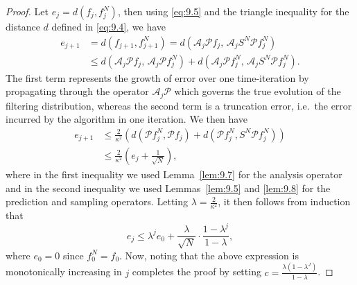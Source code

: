 \begin{proof}
  Let $e_j = d(f_j, f_j^N)$, then using \eqref{eq:9.5} and the triangle inequality for
  the distance $d$ defined in \eqref{eq:9.4}, we have
  \begin{align*}
    e_{j+1}
    &= d(f_{j+1}, f_{j+1}^N)
     = d(\mathcal{A}_j \mathcal{P} f_j,\, \mathcal{A}_j S^N \mathcal{P} f_j^N) \\
    &\leq d(\mathcal{A}_j \mathcal{P} f_j,\, \mathcal{A}_j \mathcal{P} f_j^N)
     + d(\mathcal{A}_j \mathcal{P} f_j^N,\, \mathcal{A}_j S^N \mathcal{P} f_j^N).
  \end{align*}
  The first term represents the growth of error over one time-iteration by propagating
  through the operator $\mathcal{A}_j \mathcal{P}$ which governs the true evolution of
  the filtering distribution, whereas the second term is a truncation error, i.e.\ the
  error incurred by the algorithm in one iteration. We then have
  \begin{align*}
    e_{j+1}
    &\leq \frac{2}{\kappa^2}\!\left(
       d(\mathcal{P} f_j^N, \mathcal{P} f_j)
       + d(\mathcal{P} f_j^N, S^N \mathcal{P} f_j^N)
      \right) \\
    &\leq \frac{2}{\kappa^2}\!\left(e_j + \frac{1}{\sqrt{N}}\right),
  \end{align*}
  where in the first inequality we used Lemma~\ref{lem:9.7} for the analysis operator and
  in the second inequality we used Lemmas~\ref{lem:9.5} and \ref{lem:9.8} for the
  prediction and sampling operators. Letting $\lambda = \frac{2}{\kappa^2}$, it then
  follows from induction that
  \[
    e_j \leq \lambda^j e_0 + \frac{\lambda}{\sqrt{N}} \cdot \frac{1 - \lambda^j}{1 - \lambda},
  \]
  where $e_0 = 0$ since $f_0^N = f_0$. Now, noting that the above expression is
  monotonically increasing in $j$ completes the proof by setting
  $c = \frac{\lambda(1 - \lambda^J)}{1 - \lambda}$.
\end{proof}
